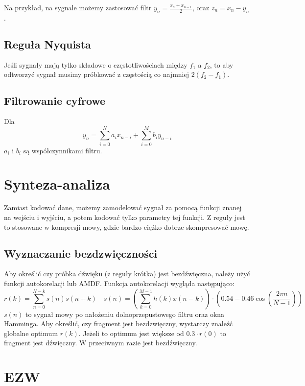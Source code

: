\documentclass{../konspekt}
\begin{document}
\begin{multicols}{2}
  Na przykład, na sygnale możemy zastosować filtr $y_n = \frac{x_n +
  x_{n - 1}}{2}$, oraz $z_n = x_n - y_n$.

  \subsection*{Reguła Nyquista}

  Jeśli sygnały mają tylko składowe o częstotliwościach między $f_1$ a $f_2$, to
  aby odtworzyć sygnał musimy próbkować z częstością co najmniej $2(f_2 - f_1)$.

  \subsection{Filtrowanie cyfrowe}

  Dla
  $$
  y_n =\sum_{i=0}^{N} a_i x_{n-i} + \sum_{i=0}^{M} b_i y_{n-i}
  $$
  $a_i$ i $b_i$ są współczynnikami filtru.

  \section*{Synteza-analiza}

  Zamiast kodować dane, możemy zamodelować sygnał za pomocą funkcji
  znanej na wejściu i wyjściu, a potem kodować tylko parametry tej funkcji.
  Z reguły jest to stosowane w kompresji mowy, gdzie bardzo ciężko dobrze
  skompresować mowę.

  \subsection*{Wyznaczanie bezdzwięczności}

  Aby określić czy próbka dźwięku (z reguły krótka) jest bezdźwięczna, należy
  użyć funkcji autokorelacji lub AMDF. Funkcja autokorelacji wygląda
  następująco:
  $$
  r(k) = \sum_{n=0}^{N-k} s(n)s(n + k) \quad s(n) = (\sum_{k=0}^{M -
  1}h(k)x(n - k)) \cdot (0.54 - 0.46 \cos(\frac{2\pi n}{N - 1}))
  $$
  $s(n)$ to sygnał mowy po nałożeniu dolnoprzepustowego filtru oraz
  okna Hamminga.
  Aby określić, czy fragment jest bezdzwięczny, wystarczy znaleźć
  globalne optimum
  $r(k)$. Jeżeli to optimum jest większe od $0.3 \cdot r(0)$ to fragment jest
  dźwięczny. W przeciwnym razie jest bezdźwięczny.

  \section*{EZW}


\end{multicols}
\end{document}
